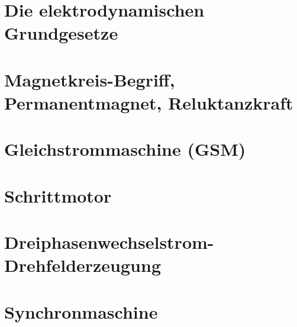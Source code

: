\documentclass[10pt,twoside,a4paper,fleqn]{article}
\begin{document}
\setcounter{tocdepth}{2} 	%
\tableofcontents 				%
\newpage
\section{Die elektrodynamischen Grundgesetze}

\section{Magnetkreis-Begriff, Permanentmagnet, Reluktanzkraft}

\section{Gleichstrommaschine (GSM)}

\section{Schrittmotor}

\section{Dreiphasenwechselstrom-Drehfelderzeugung}

\section{Synchronmaschine}

\end{document}
